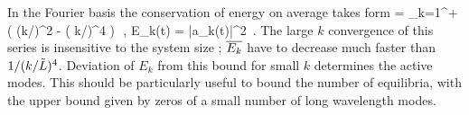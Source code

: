 In the Fourier basis  the conservation of energy on average
takes form
 = \sum_{k=1}^{+\infty} ( (k/\tildeL)^2 - ( k/\tildeL)^4 )\,
\,,\qquad
E_k(t) =  |a_k(t)|^2
\,.
The large $k$ convergence of this series is insensitive to the
system size \tildeL; $\overline{E_k}$ have to decrease much faster than
$1/( k/\tilde{L})^4$.
Deviation of $E_k$ from this bound for small $k$ determines the active modes.
This should be particularly useful to bound the number of equilibria, with
the upper bound given by zeros of a small number
of long wavelength modes.
%

